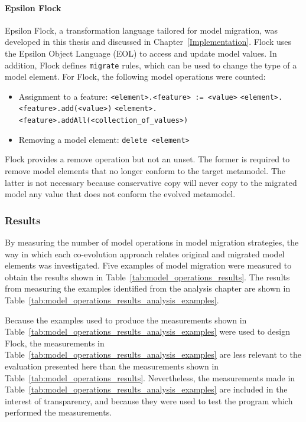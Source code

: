 \paragraph{Epsilon Flock}
Epsilon Flock, a transformation language tailored for model migration, was developed in this thesis and discussed in Chapter~\ref{Implementation}. Flock uses the Epsilon Object Language (EOL) \cite{kolovos06eol} to access and update model values. In addition, Flock defines \texttt{migrate} rules, which can be used to change the type of a model element. For Flock, the following model operations were counted:

\begin{itemize}
	\item Assignment to a feature:
	\subitem \texttt{<element>.<feature> := <value>} 
	\subitem \texttt{<element>.<feature>.add(<value>)}
	\subitem \texttt{<element>.<feature>.addAll(<collection\_of\_values>)}
	
	\item Removing a model element:
	\subitem \texttt{delete <element>}
\end{itemize}

Flock provides a remove operation but not an unset. The former is required to remove model elements that no longer conform to the target metamodel. The latter is not necessary because conservative copy will never copy to the migrated model any value that does not conform the evolved metamodel. 


\subsubsection{Results}
\label{subsubsec:quantitive_results}
By measuring the number of model operations in model migration strategies, the way in which each co-evolution approach relates original and migrated model elements was investigated. Five examples of model migration were measured to obtain the results shown in Table~\ref{tab:model_operations_results}. The results from measuring the examples identified from the analysis chapter are shown in Table~\ref{tab:model_operations_results_analysis_examples}.

Because the examples used to produce the measurements shown in Table~\ref{tab:model_operations_results_analysis_examples} were used to design Flock, the measurements in Table~\ref{tab:model_operations_results_analysis_examples} are less relevant to the evaluation presented here than the measurements shown in Table~\ref{tab:model_operations_results}. Nevertheless, the measurements made in Table~\ref{tab:model_operations_results_analysis_examples} are included in the interest of transparency, and because they were used to test the program which performed the measurements.

